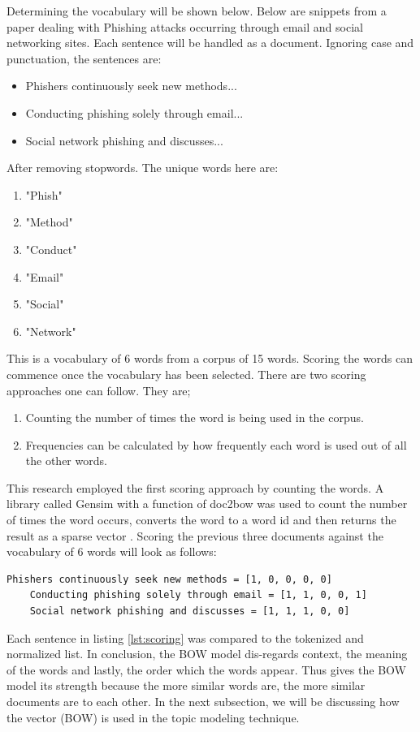 Determining the vocabulary will be shown below.
Below are snippets from a paper dealing with Phishing attacks occurring through email and social networking sites. Each sentence will be handled as a document. Ignoring case and punctuation, the sentences are:
\begin{itemize}
    \item Phishers continuously seek new methods... 
    \item Conducting phishing solely through email...
    \item Social network phishing and discusses...
\end{itemize}
After removing stopwords. The unique words here are:
\begin{enumerate}
    \item "Phish"
    \item "Method"
    \item "Conduct"
    \item "Email"
    \item "Social"
    \item "Network"
\end{enumerate}
This is a vocabulary of 6 words from a corpus of 15 words. 
Scoring the words can commence once the vocabulary has been selected. There are two scoring approaches one can follow. They are;
\begin{enumerate}
    \item Counting the number of times the word is being used in the corpus.
    \item Frequencies can be calculated by how frequently each word is used out of all the other words.
\end{enumerate}
This research employed the first scoring approach by counting the words. A library called Gensim with a function of doc2bow was used to count the number of times the word occurs, converts the word to a word id and then returns the result as a sparse vector \cite{rehurek2010software}. 
Scoring the previous three documents against the vocabulary of 6 words will look as follows:
\begin{lstlisting}[language=Text, label={lst:scoring}, caption=Scoring the documents]
    Phishers continuously seek new methods = [1, 0, 0, 0, 0]
    Conducting phishing solely through email = [1, 1, 0, 0, 1]
    Social network phishing and discusses = [1, 1, 1, 0, 0]
\end{lstlisting}
Each sentence in listing \ref{lst:scoring} was compared to the tokenized and normalized list. 
In conclusion, the BOW model dis-regards context, the meaning of the words and lastly, the order which the words appear. Thus gives the BOW model its strength because the more similar  words are, the more similar documents are to each other. In the next subsection, we will be discussing how the vector (BOW) is used in the topic modeling technique.


